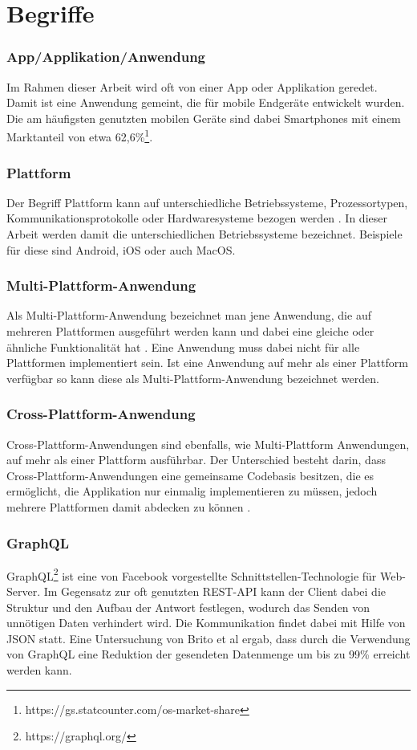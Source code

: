 \section{Begriffe}
\subsubsection{App/Applikation/Anwendung}
Im Rahmen dieser Arbeit wird oft von einer App oder Applikation geredet. Damit ist eine Anwendung gemeint, die für mobile Endgeräte entwickelt wurden. Die am häufigsten genutzten mobilen Geräte sind dabei Smartphones mit einem Marktanteil von etwa 62,6\%\footnote{https://gs.statcounter.com/os-market-share}.

\subsubsection{Plattform}
Der Begriff Plattform kann auf unterschiedliche Betriebssysteme, Prozessortypen, Kommunikationsprotokolle oder Hardwaresysteme bezogen werden \cite{2014Mulit_plattform_definition}. In dieser Arbeit werden damit die unterschiedlichen Betriebssysteme bezeichnet. Beispiele für diese sind Android, iOS oder auch MacOS.

\subsubsection{Multi-Plattform-Anwendung}
Als Multi-Plattform-Anwendung bezeichnet man jene Anwendung, die auf mehreren Plattformen ausgeführt werden kann und dabei eine gleiche oder ähnliche Funktionalität hat \cite{2014Mulit_plattform_definition}. Eine Anwendung muss dabei nicht für alle Plattformen implementiert sein. Ist eine Anwendung auf mehr als einer Plattform verfügbar so kann diese als Multi-Plattform-Anwendung bezeichnet werden.

\subsubsection{Cross-Plattform-Anwendung}
Cross-Plattform-Anwendungen sind ebenfalls, wie Multi-Plattform Anwendungen, auf mehr als einer Plattform ausführbar. Der Unterschied besteht darin, dass Cross-Plattform-Anwendungen eine gemeinsame Codebasis besitzen, die es ermöglicht, die Applikation nur einmalig implementieren zu müssen, jedoch mehrere Plattformen damit abdecken zu können \cite{2014_Cross_plattform}.

\subsubsection{GraphQL}
GraphQL\footnote{https://graphql.org/} ist eine von Facebook vorgestellte Schnittstellen-Technologie für Web-Server. Im Gegensatz zur oft genutzten REST-API kann der Client dabei die Struktur und den Aufbau der Antwort festlegen, wodurch das Senden von unnötigen Daten verhindert wird. Die Kommunikation findet dabei mit Hilfe von JSON statt. Eine Untersuchung von Brito et al \cite{IEEE_GraphQL} ergab, dass durch die Verwendung von GraphQL eine Reduktion der gesendeten Datenmenge um bis zu 99\% erreicht werden kann. 